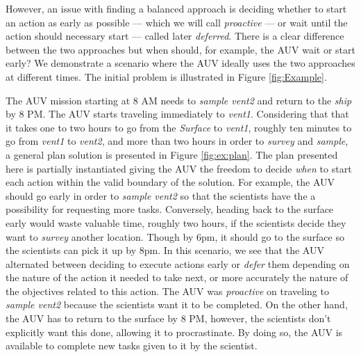 However, an issue with finding a balanced approach is deciding whether
to start an action as early as possible --- which we will call {\em
proactive} --- or wait until the action should necessary start ---
called later {\em deferred}.  There is a clear difference between the
two approaches but when should, for example, the AUV wait or start
early? We demonstrate a scenario where the AUV ideally uses the two
approaches at different times. The initial problem is illustrated in Figure
\ref{fig:Example}.

The AUV mission starting at 8 AM needs to {\em sample vent2} and
return to the {\em ship} by 8 PM. The AUV starts traveling immediately
to {\em vent1}. Considering that that it takes one to two hours to go
from the {\em Surface} to {\em vent1}, roughly ten minutes to go from
{\em vent1} to {\em vent2}, and more than two hours in order to {\em
survey} and {\em sample}, a general plan solution is presented in
Figure \ref{fig:ex:plan}. The plan presented here is partially
instantiated giving the AUV the freedom to decide {\em when} to start
each action within the valid boundary of the solution. For example,
the AUV should go early in order to {\em sample vent2} so that the
scientists have the a possibility for requesting more
tasks. Conversely, heading back to the surface early would waste
valuable time, roughly two hours, if the scientists decide they want to
{\em survey} another location. Though by 6pm, it should go to the
surface so the scientists can pick it up by 8pm. In this scenario, we
see that the AUV alternated between deciding to execute actions early
or {\em defer} them depending on the nature of the action it needed to
take next, or more accurately the nature of the objectives related to
this action. The AUV was {\em proactive} on traveling to {\em sample vent2}
because the scientists want it to be completed. On the other hand, the
AUV has to return to the surface by 8 PM, however, the scientists don't
explicitly want this done, allowing it to procrastinate.  By
doing so, the AUV is available to complete new tasks given to it by
the scientist.



